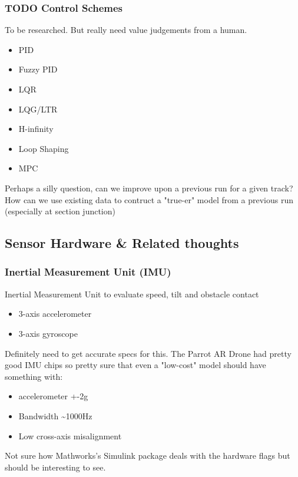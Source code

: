 \documentclass[11pt]{article}
\begin{document}
\subsubsection{{\bfseries\sffamily TODO} Control Schemes}
\label{sec:org8240aad}
To be researched. But really need value judgements from a human.

\begin{itemize}
\item PID
\item Fuzzy PID
\item LQR
\item LQG/LTR
\item H-infinity
\item Loop Shaping
\item MPC
\end{itemize}

Perhaps a silly question, can we improve upon a previous run for a given track?
How can we use existing data to contruct a "true-er" model from a previous run (especially at section junction)

\subsection{Sensor Hardware \& Related thoughts}
\label{sec:org8db1624}
\subsubsection{Inertial Measurement Unit (IMU)}
\label{sec:org349b6f4}
Inertial Measurement Unit to evaluate speed, tilt and obstacle contact
\begin{itemize}
\item 3-axis accelerometer
\item 3-axis gyroscope
\end{itemize}

Definitely need to get accurate specs for this.
The Parrot AR Drone had pretty good IMU chips so pretty sure that even a "low-cost" model should have something with:
\begin{itemize}
\item accelerometer +-2g
\item Bandwidth \textasciitilde{}1000Hz
\item Low cross-axis misalignment
\end{itemize}

Not sure how Mathworks's Simulink package deals with the hardware flags but should be interesting to see.
\end{document}
